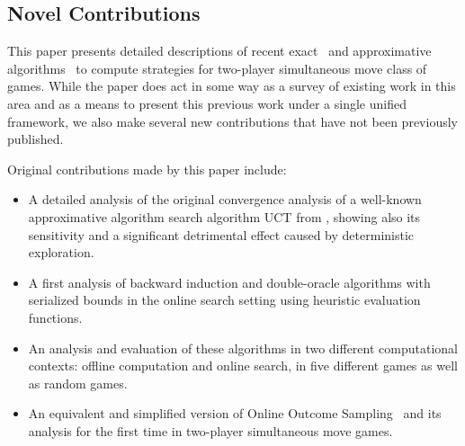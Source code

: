 \documentclass[preprint,12pt]{elsarticle}
\newcommand{\reviewchange}[1]{{\color{blue}#1}}
\begin{document}
\reviewchange{
\subsection{Novel Contributions}
\label{sec:contrib}

This paper presents detailed descriptions of recent exact~\cite{Bosansky13Using} and approximative
algorithms~\cite{Lanctot13Goofspiel,lisy2013-nips} to compute strategies for two-player simultaneous move class of games.
While the paper does act in some way as a survey of existing work in this area and as a means to present this previous work under a single unified framework, we also make several new contributions that have not been previously published.

Original contributions made by this paper include:

\begin{itemize}
\item A detailed analysis of the original convergence analysis of a well-known approximative algorithm search algorithm UCT from \cite{Shafiei09}, showing also its sensitivity and a significant detrimental effect caused by deterministic exploration.
\item A first analysis of backward induction and double-oracle algorithms with serialized bounds in the online search setting using heuristic evaluation functions.
\item An analysis and evaluation of these algorithms in two different computational contexts: offline computation and online search, in five different games as well as random games.
\item An equivalent and simplified version of Online Outcome Sampling~\cite{15aamas-iioos} and its analysis for the first time in two-player simultaneous move games.
\end{itemize}

}
\end{document}
